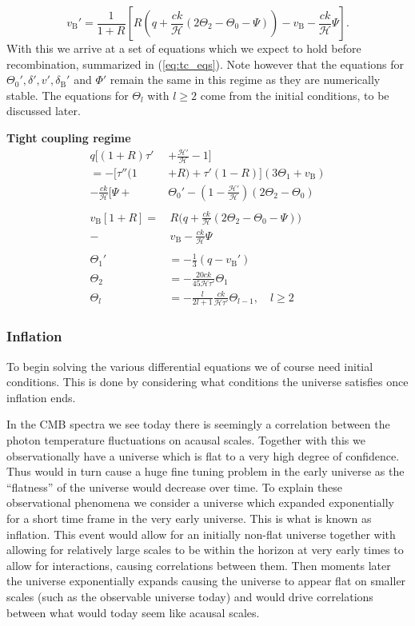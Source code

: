 \documentclass[%
reprint,
 amsmath,amssymb,
 aps,
]{revtex4-2}
\newcommand{\Hp}{\mathcal{H}}
\begin{document}
\[v_\text{B}'=\frac{1}{1+R}\left[R\left(q+\frac{ck}{\Hp}\left(2\Theta_2-\Theta_0-\Psi\right)\right)-v_\text{B}-\frac{ck}{\Hp}\Psi\right].\]
With this we arrive at a set of equations which we expect to hold before recombination, summarized in (\ref{eq:tc_eqs}). Note however that the equations for $\Theta_0',\delta',v',\delta_\text{B}'$ and $\Phi'$ remain the same in this regime as they are numerically stable. The equations for $\Theta_l$ with $l\geq2$ come from the initial conditions, to be discussed later.
\begin{tcolorbox}[
	width=\linewidth,
	colback=black!3!white,
	]
	\textbf{Tight coupling regime}
	\begin{subequations}\label{eq:tc_eqs}
		\begin{align}
			q\biggl[(1+R)\tau'&+\frac{\Hp'}{\Hp}-1\biggr]\nonumber\\
			=-\bigl[\tau''(1&+R)+\tau'(1-R)\bigr](3\Theta_1+v_\text{B})\nonumber\\
			-\frac{ck}{\Hp}\biggl[\Psi+&\Theta_0'-\left(1-\frac{\Hp'}{\Hp}\right)(2\Theta_2-\Theta_0)\\\nonumber\\
			v_\text{B}[1+R]=&\,R\biggl(q+\frac{ck}{\Hp}\left(2\Theta_2-\Theta_0-\Psi\right)\biggr)\nonumber\\
			-&\,v_\text{B}-\frac{ck}{\Hp}\Psi\\\nonumber\\
			\Theta_1'&=-\frac{1}{3}(q-v_\text{B}')\\
			\Theta_2&=-\frac{20ck}{45\Hp\tau'}\Theta_1\\
			\Theta_l&=-\frac{l}{2l+1}\frac{ck}{\Hp\tau'}\Theta_{l-1},\quad l\geq2
		\end{align}
	\end{subequations}
\end{tcolorbox}



\subsubsection{Inflation}
To begin solving the various differential equations we of course need initial conditions. This is done by considering what conditions the universe satisfies once inflation ends. 

In the CMB spectra we see today there is seemingly a correlation between the photon temperature fluctuations on acausal scales. Together with this we observationally have a universe which is flat to a very high degree of confidence. Thus would in turn cause a huge fine tuning problem in the early universe as the ``flatness'' of the universe would decrease over time. To explain these observational phenomena we consider a universe which expanded exponentially for a short time frame in the very early universe. This is what is known as inflation. This event would allow for an initially non-flat universe together with allowing for relatively large scales to be within the horizon at very early times to allow for interactions, causing correlations between them. Then moments later the universe exponentially expands causing the universe to appear flat on smaller scales (such as the observable universe today) and would drive correlations between what would today seem like acausal scales. 
\end{document}
